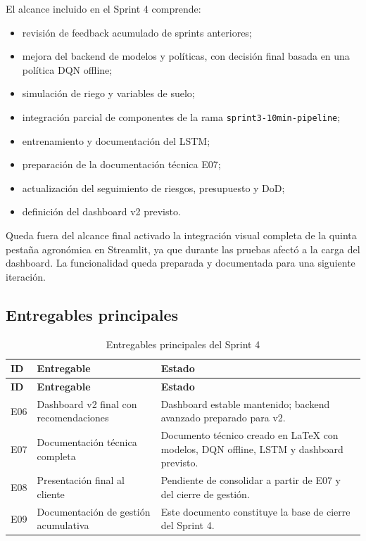 \documentclass[11pt,a4paper]{article}
\begin{document}
El alcance incluido en el Sprint 4 comprende:

\begin{itemize}
    \item revisión de feedback acumulado de sprints anteriores;
    \item mejora del backend de modelos y políticas, con decisión final basada en una política DQN offline;
    \item simulación de riego y variables de suelo;
    \item integración parcial de componentes de la rama \texttt{sprint3-10min-pipeline};
    \item entrenamiento y documentación del LSTM;
    \item preparación de la documentación técnica E07;
    \item actualización del seguimiento de riesgos, presupuesto y DoD;
    \item definición del dashboard v2 previsto.
\end{itemize}

Queda fuera del alcance final activado la integración visual completa de la quinta pestaña agronómica en Streamlit, ya que durante las pruebas afectó a la carga del dashboard. La funcionalidad queda preparada y documentada para una siguiente iteración.

\subsection{Entregables principales}

\begin{longtable}{p{}p{}p{}}
\caption{Entregables principales del Sprint 4}\\
\toprule
\textbf{ID} & \textbf{Entregable} & \textbf{Estado} \\
\midrule
\endfirsthead
\toprule
\textbf{ID} & \textbf{Entregable} & \textbf{Estado} \\
\midrule
\endhead
E06 & Dashboard v2 final con recomendaciones & Dashboard estable mantenido; backend avanzado preparado para v2. \\
E07 & Documentación técnica completa & Documento técnico creado en LaTeX con modelos, DQN offline, LSTM y dashboard previsto. \\
E08 & Presentación final al cliente & Pendiente de consolidar a partir de E07 y del cierre de gestión. \\
E09 & Documentación de gestión acumulativa & Este documento constituye la base de cierre del Sprint 4. \\
\bottomrule
\end{longtable}
\end{document}
